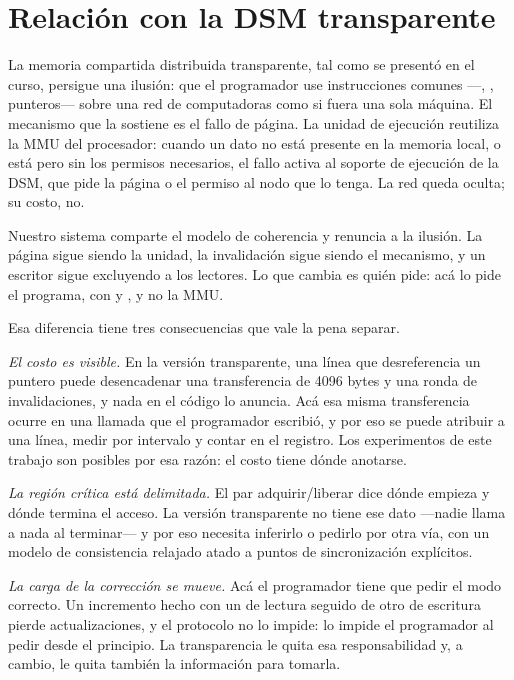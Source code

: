 \section{Relación con la DSM transparente}

La memoria compartida distribuida transparente, tal como se presentó en el
curso, persigue una ilusión: que el programador use instrucciones comunes
—, , punteros— sobre una red de computadoras como si
fuera una sola máquina. El mecanismo que la sostiene es el fallo de página.
La unidad de ejecución reutiliza la MMU del procesador: cuando un dato no está
presente en la memoria local, o está pero sin los permisos necesarios, el
fallo activa al soporte de ejecución de la DSM, que pide la página o el
permiso al nodo que lo tenga. La red queda oculta; su costo, no.

Nuestro sistema comparte el modelo de coherencia y renuncia a la ilusión. La
página sigue siendo la unidad, la invalidación sigue siendo el mecanismo, y un
escritor sigue excluyendo a los lectores. Lo que cambia es quién pide: acá lo
pide el programa, con  y , y no la MMU.

Esa diferencia tiene tres consecuencias que vale la pena separar.

\emph{El costo es visible.} En la versión transparente, una línea que
desreferencia un puntero puede desencadenar una transferencia de 4096 bytes y
una ronda de invalidaciones, y nada en el código lo anuncia. Acá esa misma
transferencia ocurre en una llamada que el programador escribió, y por eso se
puede atribuir a una línea, medir por intervalo y contar en el registro. Los
experimentos de este trabajo son posibles por esa razón: el costo tiene dónde
anotarse.

\emph{La región crítica está delimitada.} El par adquirir/liberar dice dónde
empieza y dónde termina el acceso. La versión transparente no tiene ese dato
—nadie llama a nada al terminar— y por eso necesita inferirlo o pedirlo por
otra vía, con un modelo de consistencia relajado atado a puntos de
sincronización explícitos.

\emph{La carga de la corrección se mueve.} Acá el programador tiene que pedir
el modo correcto. Un incremento hecho con un  de lectura seguido
de otro de escritura pierde actualizaciones, y el protocolo no lo impide: lo
impide el programador al pedir  desde el principio. La
transparencia le quita esa responsabilidad y, a cambio, le quita también la
información para tomarla.


